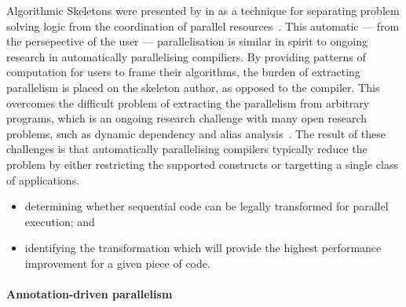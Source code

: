 Algorithmic Skeletons were presented by \citeauthor{Cole1989} in
\citeyear{Cole1989} as a technique for separating problem solving
logic from the coordination of parallel
resources~\cite{Cole1989}. This automatic --- from the persepective of
the user --- parallelisation is similar in spirit to ongoing research
in automatically parallelising compiliers. By providing patterns of
computation for users to frame their algorithms, the burden of
extracting parallelism is placed on the skeleton author, as opposed to
the compiler. This overcomes the difficult problem of extracting the
parallelism from arbitrary programs, which is an ongoing research
challenge with many open research problems, such as dynamic dependency
and alias analysis~\cite{Banerjee1993}. The result of these challenges
is that automatically parallelising compilers typically reduce the
problem by either restricting the supported constructs or targetting a
single class of applications.

\begin{itemize}
\item determining whether sequential code can be legally transformed
  for parallel execution; and
\item identifying the transformation which will provide the highest
  performance improvement for a given piece of code.
\end{itemize}



\paragraph{Annotation-driven parallelism}







